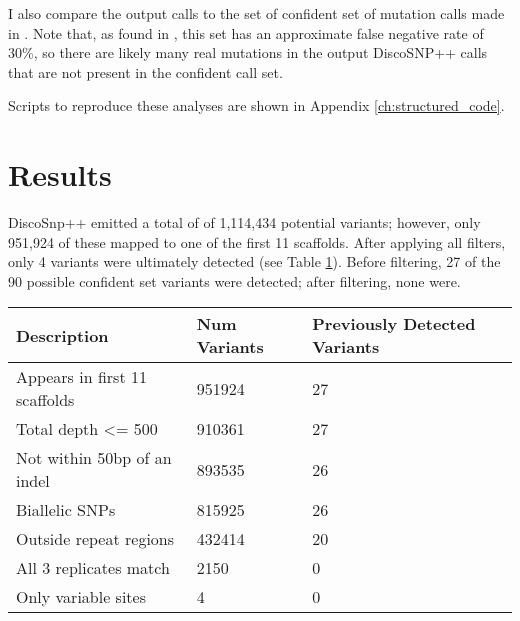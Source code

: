I also compare the output calls to the set of confident set of mutation calls made in \cite{orr_phylogenomic_2020}. Note that, as found in \cite{orr_phylogenomic_2020}, this set has an approximate false negative rate of 30\%, so there are likely many real mutations in the output DiscoSNP++ calls that are not present in the confident call set.

Scripts to reproduce these analyses are shown in Appendix \ref{ch:structured_code}.

\section{Results}

DiscoSnp++ emitted a total of of 1,114,434 potential variants; however, only 951,924 of these mapped to one of the first 11 scaffolds. After applying all filters, only 4 variants were ultimately detected (see Table \ref{tbl:ev_num_variants}). Before filtering, 27 of the 90 possible confident set variants were detected; after filtering, none were.

\begin{table}
\begin{tabularx}{\textwidth}{X X X}
\toprule
\textbf{Description} & \textbf{Num \newline Variants} & \textbf{Previously Detected Variants}\\
\midrule
Appears in first 11 scaffolds & 951924 & 27\\
Total depth <= 500 & 910361 & 27\\
Not within 50bp of an indel & 893535 & 26\\
Biallelic SNPs & 815925 & 26\\
Outside repeat regions & 432414 & 20\\
All 3 replicates match & 2150 & 0\\
Only variable sites & 4 & 0\\
\bottomrule
\end{tabularx}
\label{tbl:ev_num_variants}
\end{table}

